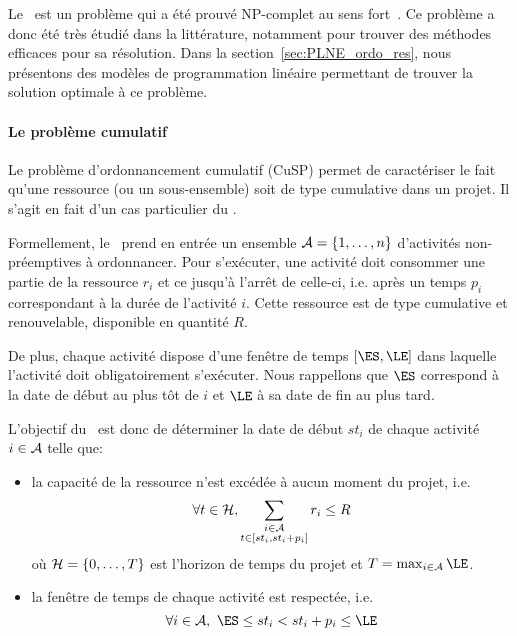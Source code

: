 Le \RCPSP~est un problème qui a été prouvé NP-complet au sens
fort~\cite{NP_RCPSP}. Ce problème a donc été très étudié dans la
littérature, notamment pour trouver des méthodes efficaces pour sa
résolution. Dans la section~\ref{sec:PLNE_ordo_res}, nous présentons des
modèles de programmation linéaire permettant de trouver la solution
optimale à ce problème. 

\paragraph{Le problème cumulatif}

\index{\CuSPidx}
Le problème d'ordonnancement cumulatif (CuSP) permet
de caractériser le fait qu'une ressource (ou un sous-ensemble) soit de
type cumulative dans un projet. Il s'agit en fait d'un cas particulier
du \RCPSP.

Formellement, le \CUSP~prend en entrée un ensemble $ {\cal A}=\{1,\dots,n\}$
d'activités non-préemptives à ordonnancer. Pour s'exécuter, une
activité doit consommer une partie de la ressource $r_i$ et ce jusqu'à
l'arrêt de celle-ci, i.e. après un temps $p_i$ correspondant à la
durée de l'activité $i$. Cette ressource est de type cumulative et
renouvelable, disponible en quantité $R$.

De plus, chaque activité dispose d'une fenêtre de temps $[\ES,\LE]$
dans laquelle l'activité doit obligatoirement s'exécuter. Nous
rappellons que $\ES$ correspond à la date de début au plus tôt de $i$
et $\LE$ à sa date de fin au plus tard.

L'objectif du \CUSP~est donc de déterminer la date de début $st_i$ de
chaque activité $i \in {\cal A}$ telle que:
\begin{itemize}
\item la capacité de la ressource n'est excédée à aucun moment du
  projet, i.e.
  \begin{equation} \forall t \in {\cal H},\sum_{\substack{i\in {\cal A}\\ t \in
        [st_i,st_i+p_i]}} r_{i} \le  R
\label{eq:CUSP_res}
\end{equation}
  où ${\cal H}=\{0,\dots,T\}$ est l'horizon de temps du projet et $T=\max_{i
    \in \A} \LE$.
\item la fenêtre de temps de chaque activité est respectée, i.e. 
  \begin{equation} \forall i \in \A,\ \ES \le st_i < st_i+p_i \le \LE \end{equation}
\end{itemize}

